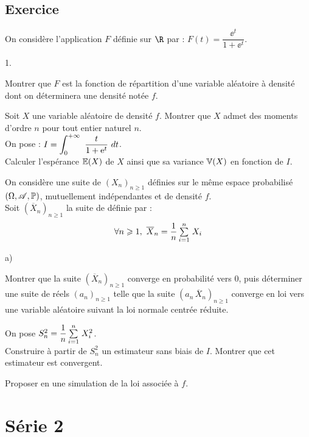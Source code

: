 \documentclass[11pt]{article}%
\begin{document}
\subsection*{Exercice} %
\noindent
On considère l'application $F$ définie sur $\R$ par : 
$F(t)=\dfrac{\ee^t}{1+\ee^t}$.
\begin{noliste}{1.}
 \item Montrer que $F$ est la fonction de répartition d'une variable 
 aléatoire à densité dont on déterminera une densité notée $f$.
 
 \item Soit $X$ une variable aléatoire de densité $f$. Montrer que $X$
 admet des moments d'ordre $n$ pour tout entier naturel $n$.\\[.2cm]
 On pose : $I=\displaystyle \int_{0}^{+\infty}\  \dfrac{t}{1+\text{e}^t} \ dt$.\\[.2cm]
 Calculer l'espérance $\mathbb{E}(X)$ de $X$ ainsi que sa variance $\mathbb{V}(X)$ en 
 fonction de $I$.
 
 \item On considère une suite de \var $(X_n)_{n\geq 1}$ définies sur le 
 même espace probabilisé $(\Omega, \mathscr{A}, \mathbb{P})$, mutuellement 
 indépendantes et de densité $f$.\\
 Soit $(\overline{X}_n)_{n\geq 1}$ la suite de \var définie par :
 \[
  \forall n\geqslant 1, \ \overline{X}_n = \dfrac{1}{n} \, {\textstyle\sum\limits_{i=1}^{n}}\hspace{.1cm} X_i
 \]
 \begin{noliste}{a)}
  \item Montrer que la suite $(\overline{X}_n)_{n\geq 1}$ converge en 
  probabilité vers $0$, puis déterminer une suite de réels 
  $(a_n)_{n\geq 1}$ telle que la suite $(a_n \, \overline{X}_n)_{n\geq 
  1}$ converge en loi vers une variable aléatoire suivant la loi 
  normale centrée réduite.
  
  \item On pose $S_n^2 = \dfrac{1}{n} \, {\textstyle\sum\limits_{i=1}^{n}}\hspace{.1cm} X_i^2$.\\
  Construire à partir de $S_n^2$ un estimateur sans biais de $I$. 
  Montrer que cet estimateur est convergent.
 \end{noliste}
 
 \item Proposer en \Scilab{} une simulation de la loi associée à $f$.
\end{noliste}





\newpage

\section*{Série 2}
\end{document}

